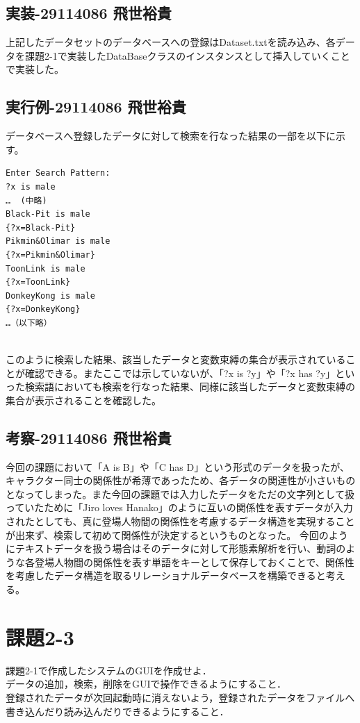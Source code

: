 \documentclass{jarticle}
\begin{document}
\subsection{実装-29114086 飛世裕貴}
上記したデータセットのデータベースへの登録はDataset.txtを読み込み、各データを課題2-1で実装したDataBaseクラスのインスタンスとして挿入していくことで実装した。
\subsection{実行例-29114086 飛世裕貴}
データベースへ登録したデータに対して検索を行なった結果の一部を以下に示す。
\\

\begin{screen}
\begin{verbatim}
Enter Search Pattern:
?x is male
…  (中略)
Black-Pit is male
{?x=Black-Pit}
Pikmin&Olimar is male
{?x=Pikmin&Olimar}
ToonLink is male
{?x=ToonLink}
DonkeyKong is male
{?x=DonkeyKong}
…（以下略）
\end{verbatim}
\end{screen}
\\

このように検索した結果、該当したデータと変数束縛の集合が表示されていることが確認できる。またここでは示していないが、「?x is ?y」や「?x has ?y」といった検索語においても検索を行なった結果、同様に該当したデータと変数束縛の集合が表示されることを確認した。
\subsection{考察-29114086 飛世裕貴}
今回の課題において「A is B」や「C has D」という形式のデータを扱ったが、キャラクター同士の関係性が希薄であったため、各データの関連性が小さいものとなってしまった。また今回の課題では入力したデータをただの文字列として扱っていたために「Jiro loves Hanako」のように互いの関係性を表すデータが入力されたとしても、真に登場人物間の関係性を考慮するデータ構造を実現することが出来ず、検索して初めて関係性が決定するというものとなった。
今回のようにテキストデータを扱う場合はそのデータに対して形態素解析を行い、動詞のような各登場人物間の関係性を表す単語をキーとして保存しておくことで、関係性を考慮したデータ構造を取るリレーショナルデータベースを構築できると考える。

\section{課題2-3}
\begin{screen}
    課題2-1で作成したシステムのGUIを作成せよ．
    \\ データの追加，検索，削除をGUIで操作できるようにすること．
    \\ 登録されたデータが次回起動時に消えないよう，登録されたデータをファイルへ書き込んだり読み込んだりできるようにすること．
\end{screen}
\end{document}

